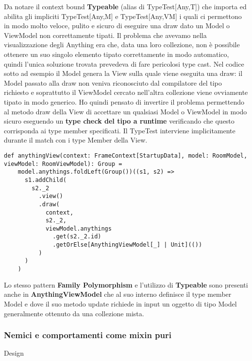 Da notare il context bound \textbf{Typeable} (alias di TypeTest[Any,T]) che importa ed abilita gli impliciti TypeTest[Any,M] e TypeTest[Any,VM] i quali ci permettono in modo molto veloce, pulito e sicuro di eseguire una draw dato un Model o ViewModel non correttamente tipati.
Il problema che avevamo nella visualizzazione degli Anything era che, data una loro collezione, non è possibile ottenere un suo singolo elemento tipato correttamente in modo automatico, quindi l'unica soluzione trovata prevedeva di fare pericolosi type cast.
Nel codice sotto ad esempio il Model genera la View sulla quale viene eseguita una draw: il Model passato alla draw non veniva riconosciuto dal compilatore del tipo richiesto e soprattutto il ViewModel cercato nell'altra collezione viene ovviamente tipato in modo generico. 
Ho quindi pensato di invertire il problema permettendo al metodo draw della View di accettare un qualsiasi Model o ViewModel in modo sicuro eseguendo un \textbf{type check del tipo a runtime} verificando che questo corrisponda ai type member specificati.
Il TypeTest interviene implicitamente durante il match con i type Member della View.

\begin{lstlisting}[basicstyle=\tiny]
def anythingView(context: FrameContext[StartupData], model: RoomModel, viewModel: RoomViewModel): Group =
    model.anythings.foldLeft(Group())((s1, s2) =>
      s1.addChild(
        s2._2
          .view()
          .draw(
            context,
            s2._2,
            viewModel.anythings
              .get(s2._2.id)
              .getOrElse[AnythingViewModel[_] | Unit](())
          )
      )
    )
\end{lstlisting}   

Lo stesso pattern \textbf{Family Polymorphism} e l'utilizzo di \textbf{Typeable} sono presenti anche in \textbf{AnythingViewModel} che al suo interno definisce il type member Model e dove il suo metodo update richiede in input un oggetto di tipo Model generalmente ottenuto da una collezione mista.

\subsubsection{Nemici e comportamenti come mixin puri}
Design

